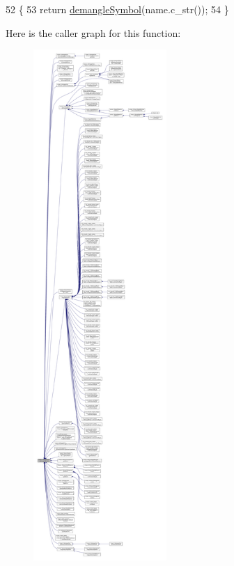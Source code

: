 \begin{DoxyCode}
52 \{
53     \textcolor{keywordflow}{return} \hyperlink{namespacesmacc_1_1introspection_aa9158a0ff0cfe83a59877e6af7d7f873}{demangleSymbol}(name.c\_str());
54 \}
\end{DoxyCode}
Here is the caller graph for this function\+:
\nopagebreak
\begin{figure}[H]
\begin{center}
\leavevmode
\includegraphics[height=550pt]{namespacesmacc_1_1introspection_a2f495108db3e57604d8d3ff5ef030302_icgraph}
\end{center}
\end{figure}
\mbox{\label{namespacesmacc_1_1introspection_af32c671351d958213f8031bb90767922}} 
